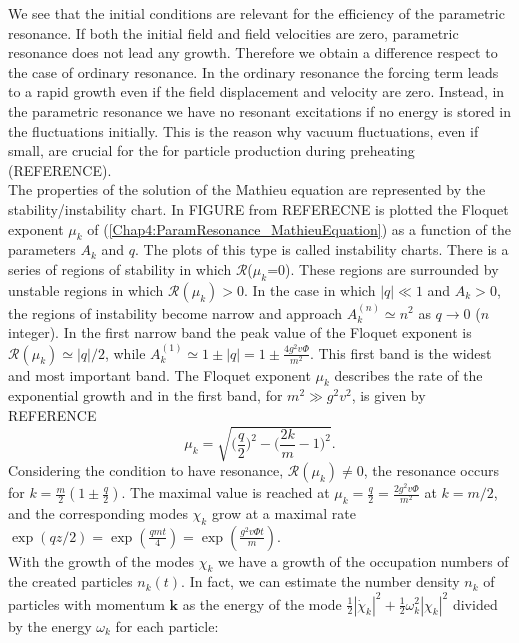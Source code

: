 \documentclass[11pt,a4paper,twoside]{book}
\begin{document}
We see that the initial conditions are relevant for the efficiency of the parametric resonance. If both the initial field and field velocities are zero, parametric resonance does not lead any growth. Therefore we obtain a difference respect to the case of ordinary resonance. In the ordinary resonance the forcing term leads to a rapid growth even if the field displacement and velocity are zero. Instead, in the parametric resonance we have no resonant excitations if no energy is stored in the fluctuations initially. This is the reason why vacuum fluctuations, even if small, are crucial for the for particle production during preheating (REFERENCE).\\
The properties of the solution of the Mathieu equation are represented by the stability/instability chart. In FIGURE from REFERECNE is plotted the Floquet exponent $ \mu_{k} $ of (\ref{Chap4:ParamResonance_MathieuEquation}) as a function of the parameters $ A_{k} $ and $ q $. The plots of this type is called instability charts. There is a series of regions of stability in which $\mathcal{R}$($\mu_{k}$=0). These regions are surrounded by unstable regions in which $\mathcal{R}(\mu_{k})>0$. In the case in which $ |q|\ll 1 $ and $ A_{k}> 0$, the regions of instability become narrow and approach $ A_{k}^{(n)}\simeq n^{2} $ as $ q\rightarrow 0 $ ($ n  $ integer). In the first narrow band the peak value of the Floquet exponent is $ \mathcal{R}(\mu_{k}) \simeq |q|/2 $, while $ A_{k}^{(1)} \simeq 1 \pm |q| = 1 \pm \frac{4g^{2}v\Phi}{m^{2}} $. This first band is the widest and most important band. The Floquet exponent $\mu_{k}$ describes the rate of the exponential growth and in the first band, for $ m^{2} \gg g^{2}v^{2} $, is given by REFERENCE
\begin{equation}
	\label{Chap4:FloquetExponent}
	\mu_{k}=\sqrt{\Bigg(\frac{q}{2}\Bigg)^{2} - \Bigg(\frac{2k}{m}-1\Bigg)^{2}}.
\end{equation}
Considering the condition to have resonance, $\mathcal{R}(\mu_{k}) \neq 0$, the resonance occurs for $ k=\frac{m}{2}(1 \pm \frac{q}{2}) $. The maximal value is reached at $\mu_{k}=\frac{q}{2}=\frac{2g^{2}v\Phi}{m^{2}}$ at $ k=m/2 $, and the corresponding modes $ \chi_{k} $ grow at a maximal rate $ \exp(qz/2)=\exp(\frac{qmt}{4})=\exp(\frac{g^{2}v\Phi t}{m}) $. \\
With the growth of the modes $ \chi_{k} $ we have a growth of the occupation numbers of the created particles $ n_{k}(t) $. In fact, we can estimate the number density $ n_{k} $ of particles with momentum $ \textbf{k} $ as the energy of the mode $ \frac{1}{2}|\dot{\chi}_{k}|^{2} + \frac{1}{2}\omega_{k}^{2}|\chi_{k}|^{2} $ divided by the energy $ \omega_{k} $ for each particle:
\end{document}
